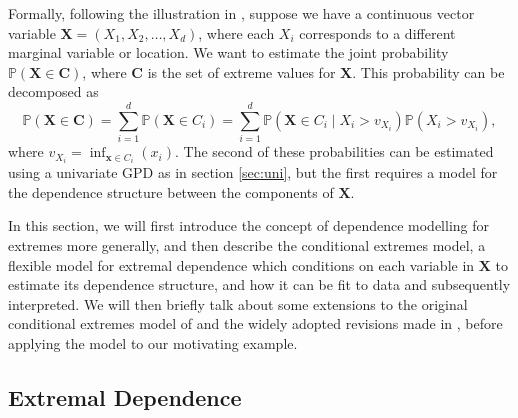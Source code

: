 \documentclass{article}
\numberwithin{equation}{section}
\begin{document}
Formally, following the illustration in \citet{Heffernan2004}, suppose we have a continuous vector variable $\bm{X} = (X_1, X_2, \ldots, X_d)$, where each $X_i$ corresponds to a different marginal variable or location.
We want to estimate the joint probability $\mathbb{P}(\bm{X} \in \bm{C})$, where $\bm{C}$ is the set of extreme values for $\bm{X}$.
This probability can be decomposed as
\begin{equation} \label{eq:decomp}
  \mathbb{P}(\bm{X} \in \bm{C}) = \sum_{i=1}^{d}{\mathbb{P}(\bm{X} \in C_i)} = \sum_{i=1}^{d}{\mathbb{P}(\bm{X} \in C_i \mid X_i > v_{X_i}) \mathbb{P}(X_i > v_{X_i})},
\end{equation}
where $v_{X_i} = \inf_{\bm{x} \in C_i}(x_i)$.
The second of these probabilities can be estimated using a univariate GPD as in section \ref{sec:uni}, but the first requires a model for the dependence structure between the components of $\bm{X}$.

In this section, we will first introduce the concept of dependence modelling for extremes more generally, and then describe the conditional extremes model, a flexible model for extremal dependence which conditions on each variable in $\bm{X}$ to estimate its dependence structure, and how it can be fit to data and subsequently interpreted.
We will then briefly talk about some extensions to the original conditional extremes model of \citet{Heffernan2004} and the widely adopted revisions made in \citet{Keef2013}, before applying the model to our motivating example.

\subsection{Extremal Dependence}
\end{document}

